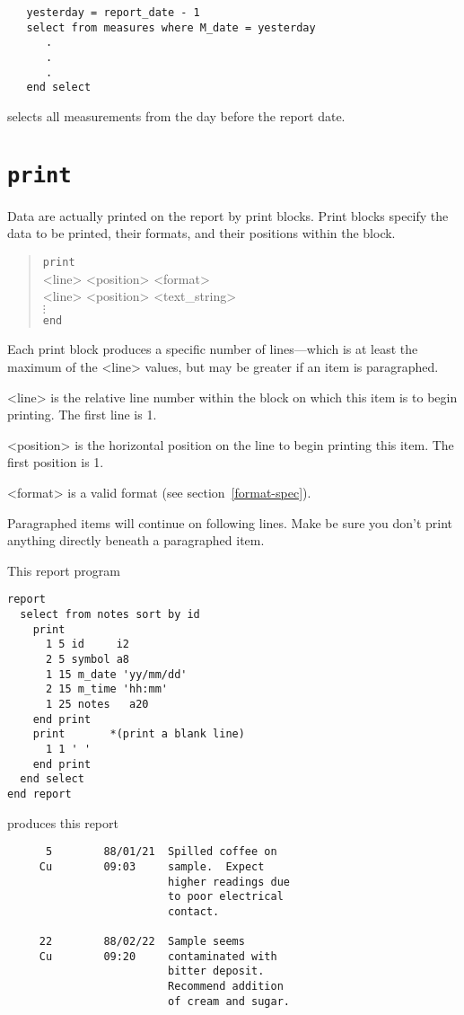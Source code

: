 \documentclass[11pt,a4paper]{report}
\begin{document}
\begin{verbatim}
   yesterday = report_date - 1
   select from measures where M_date = yesterday
      .
      .
      .
   end select
\end{verbatim}
selects all measurements from the day before the report date.
 
 
\section{\tt print}
%
Data are actually printed on the report by print blocks.
Print blocks specify the data to be printed, their formats,
and their positions within the block.
\begin{verse}
  \verb!print!\\
  <line> <position>  <format> \\
  <line> <position> <text\_string>\\
    $\vdots$\\
  \verb!end! 
\end{verse}
Each print block produces a specific number of lines---which is at least
the maximum of the <line> values, but may be greater if an item is paragraphed.
 
\begin{List}
\item[<line>] is the relative line number within the block on which
  this item is to begin printing.
  The first line is 1.
\item[<position>] is the horizontal position on the line
  to begin printing this item.
  The first position is 1.
\item[<format>] is a valid format (see section~\ref{format-spec}).
\end{List}
 
Paragraphed items will continue on following lines.
Make be sure you don't print anything directly beneath a paragraphed item.
 
\demobreak
This report program
\begin{verbatim}
report
  select from notes sort by id
    print
      1 5 id     i2
      2 5 symbol a8
      1 15 m_date 'yy/mm/dd'
      2 15 m_time 'hh:mm'
      1 25 notes   a20
    end print
    print       *(print a blank line)
      1 1 ' '
    end print
  end select
end report
\end{verbatim}
\demobreak
produces this report
 

\begin{verbatim}
      5        88/01/21  Spilled coffee on
     Cu        09:03     sample.  Expect
                         higher readings due
                         to poor electrical
                         contact.
 
     22        88/02/22  Sample seems
     Cu        09:20     contaminated with
                         bitter deposit.
                         Recommend addition
                         of cream and sugar.
\end{verbatim}
\label{para-demo}
 
\end{document}
